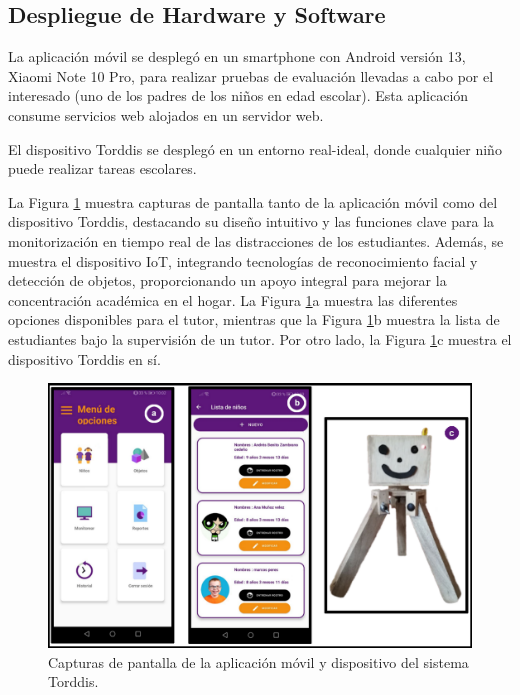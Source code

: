 \documentclass[a4paper,fleqn]{cas-sc}
\begin{document}
	\subsection{Despliegue de Hardware y Software}
	La aplicación móvil se desplegó en un smartphone con Android versión 13, Xiaomi Note 10 Pro, para realizar pruebas de evaluación llevadas a cabo por el interesado (uno de los padres de los niños en edad escolar). Esta aplicación consume servicios web alojados en un servidor web.
	
	El dispositivo Torddis se desplegó en un entorno real-ideal, donde cualquier niño puede realizar tareas escolares.
	
	La Figura \ref{fig:Torddis} muestra capturas de pantalla tanto de la aplicación móvil como del dispositivo Torddis, destacando su diseño intuitivo y las funciones clave para la monitorización en tiempo real de las distracciones de los estudiantes. Además, se muestra el dispositivo IoT, integrando tecnologías de reconocimiento facial y detección de objetos, proporcionando un apoyo integral para mejorar la concentración académica en el hogar. La Figura \ref{fig:Torddis}a muestra las diferentes opciones disponibles para el tutor, mientras que la Figura \ref{fig:Torddis}b muestra la lista de estudiantes bajo la supervisión de un tutor. Por otro lado, la Figura \ref{fig:Torddis}c muestra el dispositivo Torddis en sí.
	
	\begin{figure}[hbt!]
		\centering
		\includegraphics[width=\linewidth]{figs/Figure_9}
		\caption{Capturas de pantalla de la aplicación móvil y dispositivo del sistema Torddis.\label{fig:Torddis}} 
	\end{figure}
	
\end{document}
